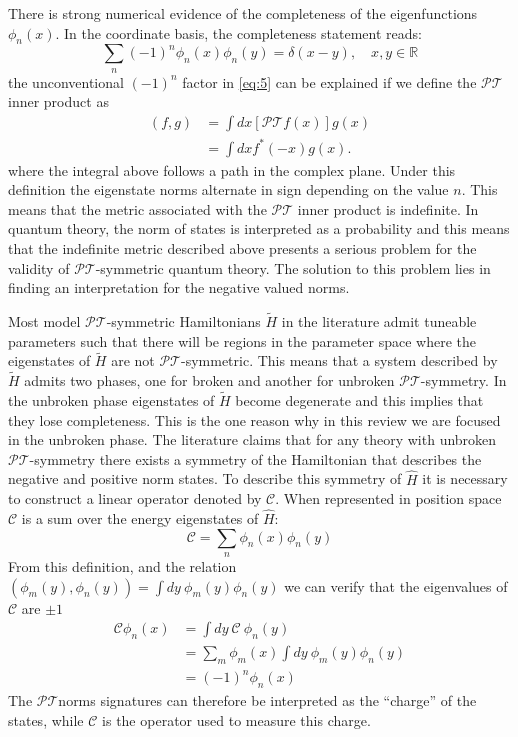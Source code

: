 \documentclass[12pt, a4paper]{report}
\newcommand\PT{\(\mathcal{PT}\)}
\newcommand\CC{\(\mathcal{C}\)}
\begin{document}
There is strong numerical evidence of the completeness of the eigenfunctions $\phi_n(x)$\cite{ComplexExtension}\cite{Bender_2004}\cite{Brody_2013}. In the coordinate basis, the completeness statement reads:
\begin{equation}\label{eq:5}
\sum_{n}(-1)^{n}\phi_n(x)\phi_n(y) = \delta(x-y),\quad x, y \in \mathbb{R}
\end{equation}
the unconventional $(-1)^n$ factor in \ref{eq:5} can be explained if we define the \PT\:inner product as
\begin{align}\label{eq:6}
\left ( f, g \right )  & = \int dx \left [ \mathcal{PT} f(x) \right ] g(x)\nonumber\\
                       & = \int dx f^{*}(-x) g(x).
\end{align}
where the integral above follows a path in the complex plane. Under this definition the eigenstate norms alternate in sign depending on the value $n$. This means that the metric associated with the \PT\: inner product is indefinite\cite{Bender_2004}\cite{Critique}.
In quantum theory, the norm of states is interpreted as a probability and this means that the indefinite metric described above presents a serious problem for the validity of \PT-symmetric quantum theory. The solution to this problem lies in finding an interpretation for
the negative valued norms\cite{PT-symmetricQM}.

Most model \PT-symmetric Hamiltonians $\tilde{H}$ in the literature admit tuneable parameters such that there will be regions in the parameter space where the eigenstates of $\tilde{H}$ are not \PT-symmetric\cite{Brody_2013}. This means that a system described by $\tilde{H}$ admits two phases, one for broken and another for unbroken \PT-symmetry. In the unbroken phase eigenstates of $\tilde{H}$ become degenerate and this implies that they lose completeness\cite{Brody_2013}. This is the one reason why in this review we are focused in the unbroken phase. The literature claims that for any theory with unbroken \PT-symmetry there exists a symmetry of the Hamiltonian that describes the negative and positive norm states. To describe this symmetry of $\hat{H}$ it is necessary to construct a linear operator denoted by \CC\cite{MustaHbeHermitian}\cite{ComplexExtension}\cite{Bender_2004}. When represented in position space \CC\: is a sum over the energy eigenstates of $\hat{H}$:
\begin{equation}\label{eq:7}
\mathcal{C} = \sum_n \phi_n(x)\phi_n(y)
\end{equation}
From this definition, and the relation $(\phi_m(y), \phi_n(y)) = \int dy\:\phi_m(y)\phi_n(y)$ we can verify that the eigenvalues of \CC\: are $\pm 1$
\begin{align}\label{eq:8}
\mathcal{C} \phi_n(x) & = \int dy\:\mathcal{C}\:\phi_n(y)\nonumber \\
& = \sum_{m}\phi_m(x)\int dy\:\phi_m(y) \phi_n(y)\nonumber \\
& = (-1)^n \phi_n(x)
\end{align}
The \PT\:norms signatures can therefore be interpreted as the ``charge'' of the states, while \CC\: is the operator used to measure this charge\cite{Bender_2004}.
\end{document}
